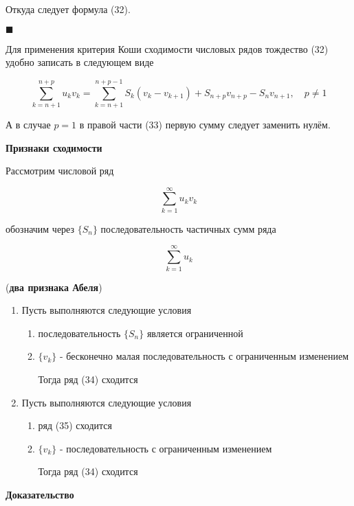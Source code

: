 Откуда следует формула (32).

\begin{flushright}
	$\blacksquare$
\end{flushright}

Для применения критерия Коши сходимости числовых рядов тождество (32) удобно записать в следующем виде

\begin{equation}
	\displaystyle\sum_{k = n + 1}^{n + p} u_kv_k = \displaystyle\sum_{k = n + 1}^{n + p - 1} S_k(v_k - v_{k + 1}) + S_{n + p}v_{n + p} - S_nv_{n + 1},\quad p \neq 1
\end{equation}

А в случае $p = 1$ в правой части (33) первую сумму следует заменить нулём.

\textbf{Признаки сходимости}

Рассмотрим числовой ряд

\begin{equation}
	\displaystyle\sum_{k = 1}^\infty u_kv_k
\end{equation}

обозначим через $\{S_n\}$ последовательность частичных сумм ряда

\begin{equation}
	\displaystyle\sum_{k  = 1}^\infty u_k
\end{equation}

\begin{theorem}
	(\textbf{два признака Абеля}) \begin{enumerate}
		\item Пусть выполняются следующие условия
		
		\begin{enumerate}
			\item последовательность $\{S_n\}$ является ограниченной
			\item $\{v_k\}$ - бесконечно малая последовательность с ограниченным изменением
			
			Тогда ряд (34) сходится
		\end{enumerate}
		
		\item Пусть выполняются следующие условия \begin{enumerate}
			\item ряд (35) сходится
			\item $\{v_k\}$ - последовательность с ограниченным изменением
			
			Тогда ряд (34) сходится
		\end{enumerate}
	\end{enumerate}
\end{theorem}
\textbf{Доказательство}

